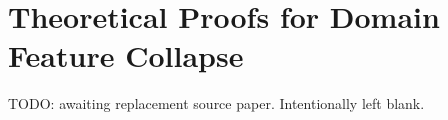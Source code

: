 \chapter{Theoretical Proofs for Domain Feature Collapse}
\label{app:domain-feature-collapse-proofs}

TODO: awaiting replacement source paper. Intentionally left blank.
